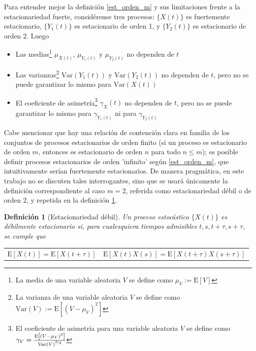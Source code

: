 \documentclass[12pt,a4paper]{mitthesis}
\newtheorem{defn}{Definici\'on}
\newcommand{\E}[1]{\mathrm{E}\left[ #1 \right]}
\newcommand{\Var}[1]{\mathrm{Var}\left( #1 \right)}
\begin{document}
Para entender mejor la definici\'on \ref{est_orden_m} y sus limitaciones frente a la 
estacionariedad fuerte, consid\'erense tres procesos: $\{X(t)\}$ es fuertemente estacionario, 
$\{Y_1(t)\}$ es estacionario de orden 1, y $\{Y_2(t)\}$ es estacionario de orden 2. Luego
\begin{itemize}
\item Las medias\footnote{La media de una variable aleatoria $V$ se define como $ \mu_V := \E{V}$} 
$ \mu_{X(t)}$, $ \mu_{Y_1(t)}$ y $ \mu_{Y_2(t)}$ no dependen de $t$

\item Las varianzas\footnote{La varianza de una variable aleatoria $V$ se define como 
$ \Var{V} := \E{\left(V - \mu_V \right)^{2}}$} $ \Var{Y_1(t)}$ y $ \Var{Y_2(t)}$ no dependen de 
$t$, pero no se puede garantizar lo mismo para $\Var{X(t)}$

\item El coeficiente de asimetr\'ia\footnote{El coeficiente de asimetr\'ia para una variable 
aleatoria $V$ se define como 
$\gamma_V = \frac{\E{\left(V-\mu_V\right)^{3}}}{\Var{V}^{\nicefrac{3}{2}}}$}
$ \gamma_X(t)$ no dependen de $t$, pero no se puede garantizar lo mismo para $ \gamma_{Y_1(t)}$ ni 
para $ \gamma_{Y_2(t)}$
\end{itemize}

Cabe mencionar que hay una relaci\'on de contenci\'on clara en familia de los conjuntos de procesos 
estacionarios de orden finito (si un proceso es estacionario de orden $m$, entonces es estacionario 
de orden $n$ para todo $n \leq m$); es posible definir procesos estacionarios de orden 'infinito' 
seg\'un \ref{est_orden_m}, que intuitivamente ser\'ian fuertemente estacionarios. 
De manera pragm\'atica, en este trabajo no se discuten tales interrogantes, sino que se usar\'a 
\'unicamente la definici\'on correspondiente al caso $m=2$, referida como estacionariedad d\'ebil o 
de orden 2, y repetida en la definici\'on \ref{est_orden_2}.

\begin{defn}[Estacionariedad d\'ebil]
Un proceso estoc\'astico $\{ X(t) \}$ es d\'ebilmente estacionario si, para cualesquiera tiempos 
admisibles $t, s, t+\tau, s+\tau$, se cumple que
\begin{center}
\begin{tabular}{cc}
$\E{X(t)} = \E{X(t+\tau)}$
&
$\E{X(t)X(s)} = \E{X(t+\tau)X(s+\tau)}$
\end{tabular}
\end{center}
\label{est_orden_2}
\end{defn}
\end{document}

